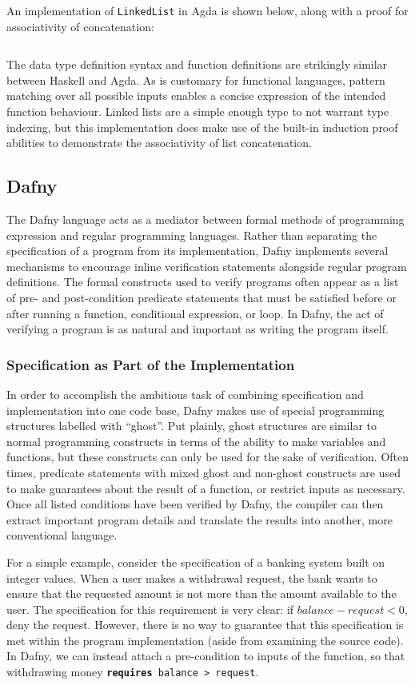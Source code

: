 \documentclass{article}
\begin{document}
An implementation of \texttt{LinkedList} in Agda is shown below, along with a proof for associativity of concatenation:
\inputminted{agda}{linked_list/main.agda}
The data type definition syntax and function definitions are strikingly similar between Haskell and Agda.
As is customary for functional languages, pattern matching over all possible inputs enables a concise expression
of the intended function behaviour. Linked lists are a simple enough type to not warrant type indexing, but this
implementation does make use of the built-in induction proof abilities to demonstrate the associativity of list concatenation.


\subsection{Dafny}

The Dafny language acts as a mediator between formal methods of programming expression and regular programming languages.
Rather than separating the specification of a program from its implementation, Dafny implements several mechanisms
to encourage inline verification statements alongside regular program definitions. The formal constructs used
to verify programs often appear as a list of pre- and post-condition
predicate statements that must be satisfied before or after running a function, conditional expression, or loop.
In Dafny, the act of verifying a program is as natural and important as writing the program itself.

\subsubsection{Specification as Part of the Implementation}

In order to accomplish the ambitious task of combining specification and implementation into one code base,
Dafny makes use of special programming structures labelled with ``ghost''. Put plainly, ghost structures are similar
to normal programming constructs in terms of the ability to make variables and functions, but these constructs
can only be used for the sake of verification. Often times, predicate statements with mixed ghost and non-ghost constructs
are used to make guarantees about the result
of a function, or restrict inputs as necessary. Once all listed conditions have been verified by Dafny,
the compiler can then extract important program details
and translate the results into another, more conventional language.

For a simple example, consider the specification of a banking system built on integer values.
When a user makes a withdrawal request, the bank wants to ensure that the requested amount is not more
than the amount available to the user. The specification for this requirement is very clear:
if $balance - request < 0$, deny the request. However, there is no way to guarantee that this specification is met
within the program implementation (aside from examining the source code). In Dafny, we can instead
attach a pre-condition to inputs of the function, so that withdrawing money \texttt{\textbf{requires} balance > request}.
\end{document}

